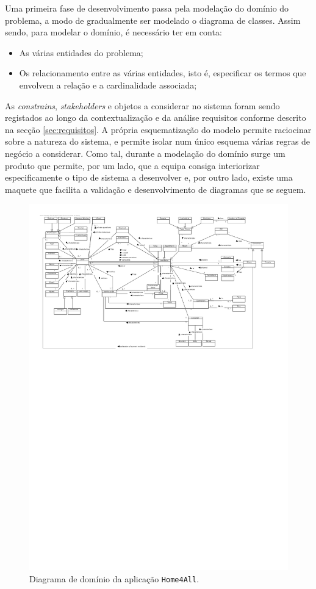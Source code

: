 
Uma primeira fase de desenvolvimento passa pela modelação do domínio do problema, a modo de gradualmente ser modelado o diagrama de classes. Assim sendo, para modelar o domínio, é  necessário ter em conta:
\begin{itemize}
    \item As várias entidades do problema;
    \item Os relacionamento entre as várias entidades, isto é, especificar os termos que envolvem a relação e a cardinalidade associada;
\end{itemize}

As \textit{constrains}, \textit{stakeholders} e objetos a considerar no sistema foram sendo registados ao longo da contextualização e da análise requisitos conforme descrito na secção \ref{sec:requisitos}. A própria esquematização do modelo permite raciocinar sobre a natureza do sistema, e permite isolar num único esquema várias regras de negócio a considerar. Como tal, durante a modelação do domínio surge um produto que permite, por um lado, que a equipa consiga interiorizar especificamente o tipo de sistema a desenvolver e, por outro lado, existe uma maquete que facilita a validação e desenvolvimento de diagramas que se seguem.

\begin{landscape}
    \begin{figure}[!ht]
        \centering
        \includegraphics[width=1.8\textwidth]{images/Home4AllDominio.pdf}
        \caption{Diagrama de domínio da aplicação \texttt{Home4All}.}
        \label{fig:diagrama_dominio}
    \end{figure}    
\end{landscape}
